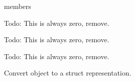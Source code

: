 \documentclass[letterpaper,10pt,english]{sphinxmanual}
\begin{document}
\begin{fulllineitems}
\begin{sphinxuseclass}{members}
\begin{description}
\begin{fulllineitems}
\label{\detokenize{body:Body.int_ddr}}
\pysigstartsignatures
{}
\pysigstopsignatures
\sphinxAtStartPar
Todo: This is always zero, remove.

\end{fulllineitems}


\begin{fulllineitems}
\label{\detokenize{body:Body.int_dr}}
\pysigstartsignatures
{}
\pysigstopsignatures
\sphinxAtStartPar
Todo: This is always zero, remove.

\end{fulllineitems}


\begin{fulllineitems}
\label{\detokenize{body:Body.int_dr_O_dr}}
\pysigstartsignatures
{}
\pysigstopsignatures
\sphinxAtStartPar
Todo: This is always zero, remove.

\end{fulllineitems}


\begin{fulllineitems}
\label{\detokenize{body:Body.toStruct}}
\pysigstartsignatures
{}
\pysigstopsignatures
\sphinxAtStartPar
Convert object to a struct representation.

\end{fulllineitems}


\end{description}

\end{sphinxuseclass}
\end{fulllineitems}
\end{document}
